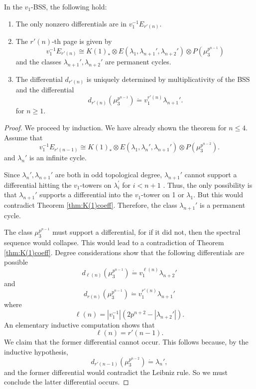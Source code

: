 \begin{thm}\label{key to proof 2}
	In the $v_1$-BSS, the following hold: 
	\begin{enumerate}
		\item The only nonzero differentials are in $v_1^{-1}E_{r'(n)}$. 
		\item The $r'(n)$-th page is given by 
		\[
		v_1^{-1}E_{r'(n)} \cong K(1)_*\otimes E(\lambda_1, \lambda_{n+1}', \lambda_{n+2}')\otimes P(\mu_3^{p^{n-1}})
		\]
		and the classes $\lambda_{n+1}', \lambda_{n+2}'$ are permanent cycles. 
		\item The differential $d_{r'(n)}$ is uniquely determined by multiplicativity of the BSS and the differential
		\[
		d_{r'(n)}(\mu_3^{p^{n-1}})\dot{=}v_1^{r'(n)}\lambda_{n+1}'.
		\]
		for $n\ge 1$.
	\end{enumerate}
\end{thm}
\begin{proof}
	We proceed by induction. We have already shown the theorem for $n\leq 4$. Assume that 
	\[
	v_1^{-1}E_{r'(n-1)}\cong K(1)_*\otimes E(\lambda_1, \lambda_n', \lambda_{n+1}')\otimes P(\mu_3^{p^{n-2}}).
	\]
	and $\lambda_n'$ is an infinite cycle.  
	
	Since $\lambda_n', \lambda_{n+1}'$ are both in odd topological degree, $\lambda_{n+1}'$ cannot support a differential hitting the $v_1$-towers on $\lambda_i^{\prime}$ for $i<n+1$ . Thus, the only possibility is that $\lambda_{n+1}'$ supports a differential into the $v_1$-tower on 1 or $\lambda_1$. But this would contradict Theorem \ref{thm:K(1)coeff}. Therefore, the class $\lambda_{n+1}'$ is a permanent cycle. 
	
	The class $\mu_3^{p^{n-1}}$ must support a differential, for if it did not, then the spectral sequence would collapse. This would lead to a contradiction of Theorem \ref{thm:K(1)coeff}. Degree considerations show that the following differentials are possible
	\[
	d_{\ell(n)}(\mu_3^{p^{n-1}})\dot{=}v_1^{\ell(n)}\lambda_{n+2}'
	\]
	and 
	\[
	d_{r(n)}(\mu_3^{p^{n-1}})\dot{=}v_1^{r'(n)}\lambda_{n+1}'
	\]
	where
	\[
	\ell(n) = |v_1^{-1}|(2p^{n+2}-|\lambda_{n+2}'|).
	\]
	An elementary inductive computation shows that 
	\[
	\ell(n) = r'(n-1).
	\]
	We claim that the former differential cannot occur. This follows because, by the inductive hypothesis, 
	\[
	d_{r'(n-1)} (\mu_3^{p^{n-2}})\dot{=}\lambda_{n}', 
	\]
	and the former differential would contradict the Leibniz rule. So we must conclude the latter differential occurs.
\end{proof}


